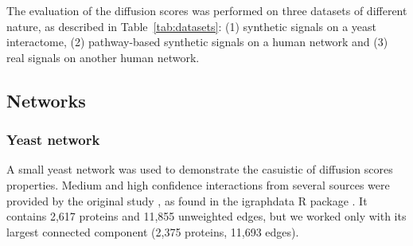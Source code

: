 \documentclass[final]{bioinfo}
\begin{document}
\begin{methods}
The evaluation of the diffusion scores was performed on three datasets of different nature, as described in Table~\ref{tab:datasets}: (1) synthetic signals on a yeast interactome, (2) pathway-based synthetic signals on a human network and (3) real signals on another human network.

\begin{table*}[th]
\centering
{}
\caption{
Case studies for characterising biases and benchmarking diffusion scores.
Interactions in explanatory models are denoted by a colon.
}
\label{tab:datasets}
\end{table*}

\subsection*{Networks}

\subsubsection*{Yeast network}

A small yeast network was used to demonstrate the casuistic of diffusion scores properties. 
Medium and high confidence interactions from several sources were provided by the original study \citep{yeast_network}, as found in the igraphdata R package \citep{igraphdata}.
It contains 2,617 proteins and 11,855 unweighted edges, but we worked only with its largest connected component (2,375 proteins, 11,693 edges).


\end{methods}
\end{document}

